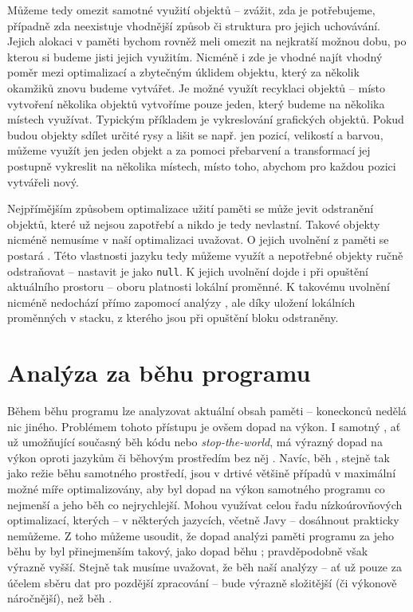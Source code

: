 Můžeme tedy omezit samotné využití objektů -- zvážit, zda je potřebujeme, případně zda neexistuje vhodnější způsob či struktura pro jejich uchovávání. Jejich alokaci v paměti bychom rovněž meli omezit na nejkratší možnou dobu, po kterou si budeme jisti jejich využitím. Nicméně i zde je vhodné najít vhodný poměr mezi optimalizací a zbytečným úklidem objektu, který za několik okamžiků znovu budeme vytvářet. Je možné využít recyklaci objektů -- místo vytvoření několika objektů vytvoříme pouze jeden, který budeme na několika místech využívat. Typickým příkladem je vykreslování grafických objektů. Pokud budou objekty sdílet určité rysy a lišit se např. jen pozicí, velikostí a barvou, můžeme využít jen jeden objekt a za pomoci přebarvení a transformací jej postupně vykreslit na několika místech, místo toho, abychom pro každou pozici vytvářeli nový.

Nejpřímějším způsobem optimalizace užití paměti se může jevit odstranění objektů, které už nejsou zapotřebí a nikdo je tedy nevlastní. Takové objekty nicméně nemusíme v naší optimalizaci uvažovat. O jejich uvolnění z paměti se postará . Této vlastnosti jazyku tedy můžeme využít a nepotřebné objekty ručně odstraňovat -- nastavit je jako \texttt{null}. K jejich uvolnění dojde i při opuštění aktuálního prostoru -- oboru platnosti lokální proměnné. K takovému uvolnění nicméně nedochází přímo zapomocí analýzy , ale díky uložení lokálních proměnných v stacku, z kterého jsou při opuštění bloku odstraněny.


\section{Analýza za běhu programu}
\label{runtime-analysis}
Během běhu programu lze analyzovat aktuální obsah paměti --  koneckonců nedělá nic jiného. Problémem tohoto přístupu je ovšem dopad na výkon. I samotný , ať už umožňující současný běh kódu nebo \textit{stop-the-world}, má výrazný dopad na výkon oproti jazykům či běhovým prostředím bez něj \cite{gc}. Navíc, běh , stejně tak jako režie běhu samotného prostředí, jsou v drtivé většině případů v maximální možné míře optimalizovány, aby byl dopad na výkon samotného programu co nejmenší a jeho běh co nejrychlejší. Mohou využívat celou řadu nízkoúrovňových optimalizací, kterých -- v některých jazycích, včetně Javy -- dosáhnout prakticky nemůžeme. Z toho můžeme usoudit, že dopad analýzi paměti programu za jeho běhu by byl přinejmenším takový, jako dopad běhu ; pravděpodobně však výrazně vyšší. Stejně tak musíme uvažovat, že běh naší analýzy -- ať už pouze za účelem sběru dat pro pozdější zpracování -- bude výrazně složitější (či výkonově náročnější), než běh .


